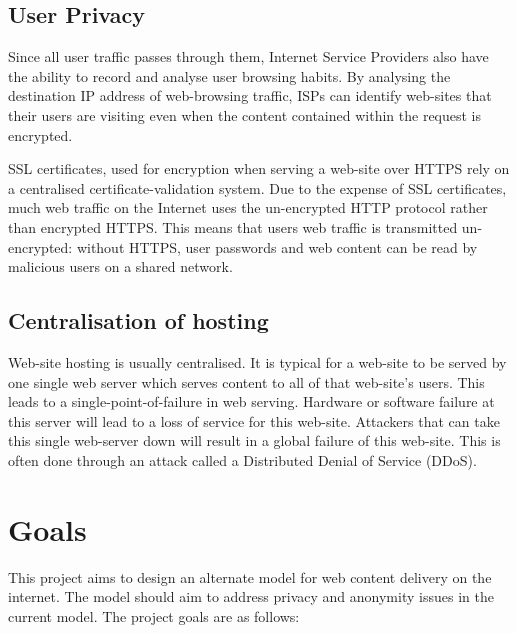 \subsection{User Privacy}

Since all user traffic passes through them, Internet Service Providers also have
the ability to record and analyse user browsing habits. By analysing the destination
IP address of web-browsing traffic, ISPs can identify web-sites
that their users are visiting even when the content contained within the request is
encrypted.

SSL certificates, used for encryption when serving a web-site over HTTPS rely on a
centralised certificate-validation system. Due to the expense of SSL certificates,
much web traffic on the Internet uses the un-encrypted HTTP protocol rather than
encrypted HTTPS. This means that users web traffic is transmitted un-encrypted: without
HTTPS, user passwords and web content can be read by malicious users on a shared network.

\subsection{Centralisation of hosting}

Web-site hosting is usually centralised. It is typical for a web-site to be served by
one single web server which serves content to all of that web-site's users. This leads
to a single-point-of-failure in web serving. Hardware or software failure at this server
will lead to a loss of service for this web-site. Attackers that can take this single web-server
down will result in a global failure of this web-site. This is often done through an attack
called a Distributed Denial of Service (DDoS).

\section{Goals}

This project aims to design an alternate model for web content delivery on the internet.
The model should aim to address privacy and anonymity issues in the current model.
The project goals are as follows:

